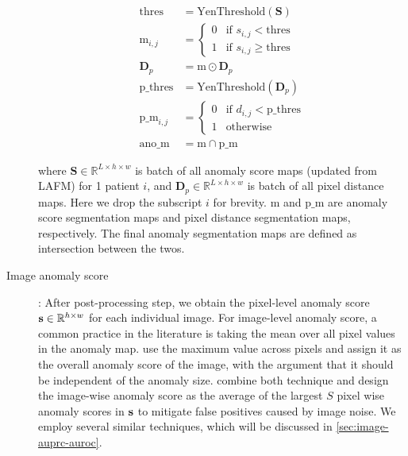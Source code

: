 \begin{description}
\begin{equation}
\begin{aligned}
            \text{thres} &= \mathrm{YenThreshold}(\mathbf{S}) \\
            \text{m}_{i, j} &= 
            \begin{cases}
            0 & \text{if } s_{i,j} < \text{thres} \\
            1 & \text{if } s_{i,j} \geq \text{thres}
            \end{cases} \\
            \mathbf{D}_{p} &= \text{m} \odot \mathbf{D}_p \\
            \text{p\_thres} &= \mathrm{YenThreshold}(\mathbf{D}_p) \\
            \text{p\_m}_{i,j} &=
            \begin{cases}
            0 & \text{if } d_{i,j} < \text{p\_thres} \\
            1 & \text{otherwise}
            \end{cases} \\
            \text{ano\_m} &= \text{m} \cap \text{p\_m}
        \end{aligned}
    \end{equation}

    where $\mathbf{S} \in \mathbb{R}^{L \times h \times w}$ is batch of all anomaly score maps (updated from LAFM) for 1 patient $i$, and $\mathbf{D}_p \in \mathbb{R}^{L \times h \times w}$ is batch of all pixel distance maps. Here we drop the subscript $i$ for brevity. $\text{m}$ and $\text{p\_m}$ are anomaly score segmentation maps and pixel distance segmentation maps, respectively. The final anomaly segmentation maps are defined as intersection between the twos. 
    
    \item[Image anomaly score]: After post-processing step, we obtain the pixel-level anomaly score ${\mathbf{s}} \in \mathbb{R}^{h \times w}$ for each individual image. For image-level anomaly score, a common practice in the literature is taking the mean over all pixel values in the anomaly map. \cite{DDAD, lagogiannisUnsupervisedPathologyDetection2024} use the maximum value across pixels and assign it as the overall anomaly score of the image, with the argument that it should be independent of the anomaly size. \cite{wuUADPostSampling2024} combine both technique and design the image-wise anomaly score as the average of the largest $S$ pixel wise anomaly scores in ${\mathbf{s}}$ to mitigate false positives caused by image noise. We employ several similar techniques, which will be discussed in \cref{sec:image-auprc-auroc}.
\end{description}




